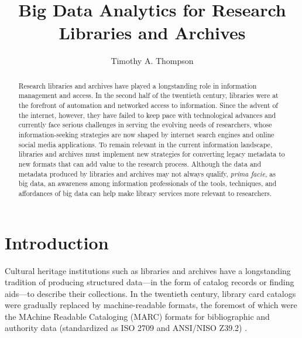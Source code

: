 \documentclass[sigconf]{acmart}
\begin{document}
\title{Big Data Analytics for Research Libraries and Archives}
\author{Timothy A. Thompson}

\begin{abstract}
Research libraries and archives have played a longstanding role in information management and access. In the second half of the twentieth century, libraries were at the forefront of automation and networked access to information. Since the advent of the internet, however, they have failed to keep pace with technological advances and currently face serious challenges in serving the evolving needs of researchers, whose information-seeking strategies are now shaped by internet search engines and online social media applications. To remain relevant in the current information landscape, libraries and archives must implement new strategies for converting legacy metadata to new formats that can add value to the research process. Although the data and metadata produced by libraries and archives may not always qualify, \textit{prima facie}, as big data, an awareness among information professionals of the tools, techniques, and affordances of big data can help make library services more relevant to researchers.
\end{abstract}


\maketitle

\section{Introduction}
Cultural heritage institutions such as libraries and archives have a longstanding tradition of producing structured data---in the form of catalog records or finding aids---to describe their collections. In the twentieth century, library card catalogs were gradually replaced by machine-readable formats, the foremost of which were the MAchine Readable Cataloging (MARC) formats for bibliographic and authority data (standardized as ISO 2709 and ANSI/NISO Z39.2) \cite{kF12}. 
\end{document}
